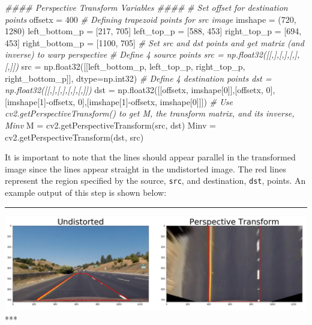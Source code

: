 \documentclass[11pt]{article}
\makeatletter
\def\maxwidth{\ifdim\Gin@nat@width>\linewidth\linewidth
    \else\Gin@nat@width\fi}
\let\Oldincludegraphics\includegraphics
\renewcommand{\includegraphics}[1]{\Oldincludegraphics[width=.8\maxwidth]{#1}}
\newenvironment{Shaded}{}{}
\newcommand{\DecValTok}[1]{\textcolor[rgb]{0.25,0.63,0.44}{{#1}}}
\newcommand{\CommentTok}[1]{\textcolor[rgb]{0.38,0.63,0.69}{\textit{{#1}}}}
\newcommand{\NormalTok}[1]{{#1}}
\newcommand{\OperatorTok}[1]{\textcolor[rgb]{0.40,0.40,0.40}{{#1}}}
\makeatother
\begin{document}
\begin{Shaded}
\begin{Highlighting}[]
\CommentTok{#### Perspective Transform Variables ####}
\CommentTok{# Set offset for destination points}
\NormalTok{offsetx }\OperatorTok{=} \DecValTok{400}
\CommentTok{# Defining trapezoid points for src image }
\NormalTok{imshape }\OperatorTok{=}\NormalTok{ (}\DecValTok{720}\NormalTok{, }\DecValTok{1280}\NormalTok{)}
\NormalTok{left_bottom_p }\OperatorTok{=}\NormalTok{ [}\DecValTok{217}\NormalTok{, }\DecValTok{705}\NormalTok{]}
\NormalTok{left_top_p }\OperatorTok{=}\NormalTok{ [}\DecValTok{588}\NormalTok{, }\DecValTok{453}\NormalTok{]}
\NormalTok{right_top_p }\OperatorTok{=}\NormalTok{ [}\DecValTok{694}\NormalTok{, }\DecValTok{453}\NormalTok{]}
\NormalTok{right_bottom_p }\OperatorTok{=}\NormalTok{ [}\DecValTok{1100}\NormalTok{, }\DecValTok{705}\NormalTok{]}
\CommentTok{# Set src and dst points and get matrix (and inverse) to warp perspective}
\CommentTok{# Define 4 source points src = np.float32([[,],[,],[,],[,]])}
\NormalTok{src }\OperatorTok{=}\NormalTok{ np.float32([[left_bottom_p, left_top_p, right_top_p, right_bottom_p]], dtype}\OperatorTok{=}\NormalTok{np.int32)}
\CommentTok{# Define 4 destination points dst = np.float32([[,],[,],[,],[,]])}
\NormalTok{dst }\OperatorTok{=}\NormalTok{ np.float32([[offsetx, imshape[}\DecValTok{0}\NormalTok{]],[offsetx, }\DecValTok{0}\NormalTok{],[imshape[}\DecValTok{1}\NormalTok{]}\OperatorTok{-}\NormalTok{offsetx, }\DecValTok{0}\NormalTok{],[imshape[}\DecValTok{1}\NormalTok{]}\OperatorTok{-}\NormalTok{offsetx, imshape[}\DecValTok{0}\NormalTok{]]])}
\CommentTok{# Use cv2.getPerspectiveTransform() to get M, the transform matrix, and its inverse, Minv}
\NormalTok{M }\OperatorTok{=}\NormalTok{ cv2.getPerspectiveTransform(src, dst)}
\NormalTok{Minv }\OperatorTok{=}\NormalTok{ cv2.getPerspectiveTransform(dst, src)}
\end{Highlighting}
\end{Shaded}

It is important to note that the lines should appear parallel in the
transformed image since the lines appear straight in the undistorted
image. The red lines represent the region specified by the source,
\texttt{src}, and destination, \texttt{dst}, points. An example output
of this step is shown below:

\begin{center}\rule{0.5\linewidth}{\linethickness}\end{center}

\includegraphics{./output_images/writeup_images/straight_lines1_birdseye.png}
***
\end{document}
